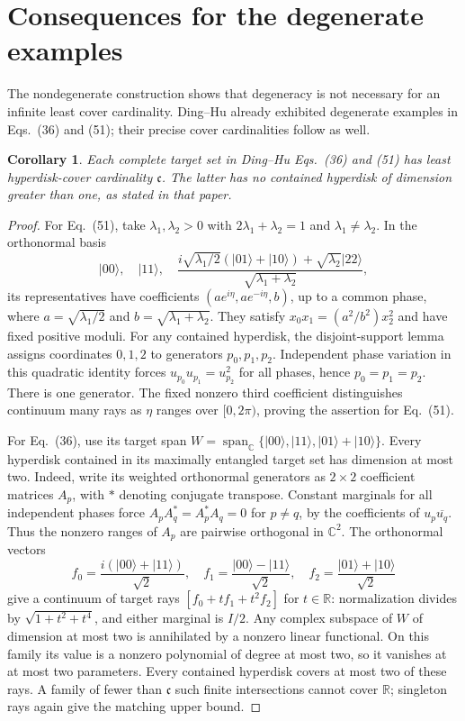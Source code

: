 \documentclass[11pt]{article}
\newtheorem{corollary}[theorem]{Corollary}
\newcommand{\C}{\mathbb C}
\newcommand{\Span}{\operatorname{span}_{\C}}
\begin{document}
\section{Consequences for the degenerate examples}
The nondegenerate construction shows that degeneracy is not necessary
for an infinite least cover cardinality. Ding--Hu already exhibited
degenerate examples in Eqs.~(36) and (51); their precise cover
cardinalities follow as well.

\begin{corollary}\label{cor:degenerate}
Each complete target set in Ding--Hu Eqs.~(36) and (51) has least
hyperdisk-cover cardinality $\mathfrak c$. The latter has no contained
hyperdisk of dimension greater than one, as stated in that paper.
\end{corollary}
\begin{proof}
For Eq.~(51), take $\lambda_1,\lambda_2>0$ with
$2\lambda_1+\lambda_2=1$ and $\lambda_1\ne\lambda_2$.
In the orthonormal basis
\[
 |00\rangle,\quad |11\rangle,\quad
 \frac{i\sqrt{\lambda_1/2}(|01\rangle+|10\rangle)
             +\sqrt{\lambda_2}|22\rangle}{\sqrt{\lambda_1+\lambda_2}},
\]
its representatives have coefficients
$(ae^{i\eta},ae^{-i\eta},b)$, up to a common phase, where
$a=\sqrt{\lambda_1/2}$ and $b=\sqrt{\lambda_1+\lambda_2}$.
They satisfy $x_0x_1=(a^2/b^2)x_2^2$ and have fixed positive moduli.
For any contained hyperdisk, the disjoint-support lemma assigns
coordinates $0,1,2$ to generators $p_0,p_1,p_2$.
Independent phase variation in this quadratic identity forces
$u_{p_0}u_{p_1}=u_{p_2}^2$ for all phases, hence
$p_0=p_1=p_2$. There is one generator. The fixed nonzero third
coefficient distinguishes continuum many rays as $\eta$ ranges over
$[0,2\pi)$, proving the assertion for Eq.~(51).

For Eq.~(36), use its target span
$W=\Span\{|00\rangle,|11\rangle,|01\rangle+|10\rangle\}$.
Every hyperdisk contained in its maximally entangled target set has
dimension at most two. Indeed, write its weighted orthonormal generators
as $2\times2$ coefficient matrices $A_p$, with $*$ denoting conjugate
transpose. Constant marginals for all
independent phases force $A_pA_q^*=A_p^*A_q=0$ for $p\ne q$, by the
coefficients of $u_p\overline{u_q}$. Thus the nonzero ranges of $A_p$
are pairwise orthogonal in $\C^2$.
The orthonormal vectors
\[
 f_0=\frac{i(|00\rangle+|11\rangle)}{\sqrt2},\quad
 f_1=\frac{|00\rangle-|11\rangle}{\sqrt2},\quad
 f_2=\frac{|01\rangle+|10\rangle}{\sqrt2}
\]
give a continuum of target rays
$[f_0+t f_1+t^2 f_2]$ for $t\in\mathbb R$: normalization divides by
$\sqrt{1+t^2+t^4}$, and either marginal is $I/2$.
Any complex subspace of $W$ of dimension at most two is annihilated
by a nonzero linear functional. On this family its value is a nonzero
polynomial of degree at most two, so it vanishes at at most two parameters.
Every contained hyperdisk covers at most two of these rays.
A family of fewer than $\mathfrak c$ such finite intersections cannot
cover $\mathbb R$; singleton rays again give the matching upper bound.
\end{proof}
\end{document}
